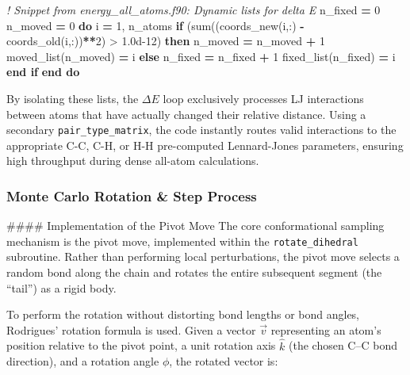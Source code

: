\documentclass[
]{article}
\newenvironment{Shaded}{}{}
\newcommand{\BuiltInTok}[1]{\textcolor[rgb]{0.00,0.50,0.00}{#1}}
\newcommand{\CommentTok}[1]{\textcolor[rgb]{0.38,0.63,0.69}{\textit{#1}}}
\newcommand{\DecValTok}[1]{\textcolor[rgb]{0.25,0.63,0.44}{#1}}
\newcommand{\FloatTok}[1]{\textcolor[rgb]{0.25,0.63,0.44}{#1}}
\newcommand{\FunctionTok}[1]{\textcolor[rgb]{0.02,0.16,0.49}{#1}}
\newcommand{\KeywordTok}[1]{\textcolor[rgb]{0.00,0.44,0.13}{\textbf{#1}}}
\newcommand{\NormalTok}[1]{#1}
\newcommand{\OperatorTok}[1]{\textcolor[rgb]{0.40,0.40,0.40}{#1}}
\begin{document}
\begin{Shaded}
\begin{Highlighting}[]
\CommentTok{! Snippet from energy\_all\_atoms.f90: Dynamic lists for delta E}
\NormalTok{n\_fixed }\KeywordTok{=} \DecValTok{0}
\NormalTok{n\_moved }\KeywordTok{=} \DecValTok{0}
\KeywordTok{do}\NormalTok{ i }\KeywordTok{=} \DecValTok{1}\NormalTok{, n\_atoms}
   \KeywordTok{if}\NormalTok{ (}\FunctionTok{sum}\NormalTok{((coords\_new(i,:) }\KeywordTok{{-}}\NormalTok{ coords\_old(i,:))}\KeywordTok{**}\DecValTok{2}\NormalTok{) }\OperatorTok{\textgreater{}} \FloatTok{1.0d{-}12}\NormalTok{) }\KeywordTok{then}
\BuiltInTok{     n}\NormalTok{\_moved }\KeywordTok{=}\NormalTok{ n\_moved }\KeywordTok{+} \DecValTok{1}
\BuiltInTok{     m}\NormalTok{oved\_list(n\_moved) }\KeywordTok{=}\NormalTok{ i}
   \KeywordTok{else}
\BuiltInTok{     n}\NormalTok{\_fixed }\KeywordTok{=}\NormalTok{ n\_fixed }\KeywordTok{+} \DecValTok{1}
\BuiltInTok{     f}\NormalTok{ixed\_list(n\_fixed) }\KeywordTok{=}\NormalTok{ i}
   \KeywordTok{end if}
\KeywordTok{end do}
\end{Highlighting}
\end{Shaded}

By isolating these lists, the \(\Delta E\) loop exclusively processes LJ
interactions between atoms that have actually changed their relative
distance. Using a secondary \texttt{pair\_type\_matrix}, the code
instantly routes valid interactions to the appropriate C-C, C-H, or H-H
pre-computed Lennard-Jones parameters, ensuring high throughput during
dense all-atom calculations.

\subsubsection{Monte Carlo Rotation \& Step
Process}\label{monte-carlo-rotation-step-process}

\#\#\#\# Implementation of the Pivot Move The core conformational
sampling mechanism is the pivot move, implemented within the
\texttt{rotate\_dihedral} subroutine. Rather than performing local
perturbations, the pivot move selects a random bond along the chain and
rotates the entire subsequent segment (the ``tail'') as a rigid body.

To perform the rotation without distorting bond lengths or bond angles,
Rodrigues' rotation formula is used. Given a vector \(\vec{v}\)
representing an atom's position relative to the pivot point, a unit
rotation axis \(\hat{k}\) (the chosen C--C bond direction), and a
rotation angle \(\phi\), the rotated vector is:
\end{document}
